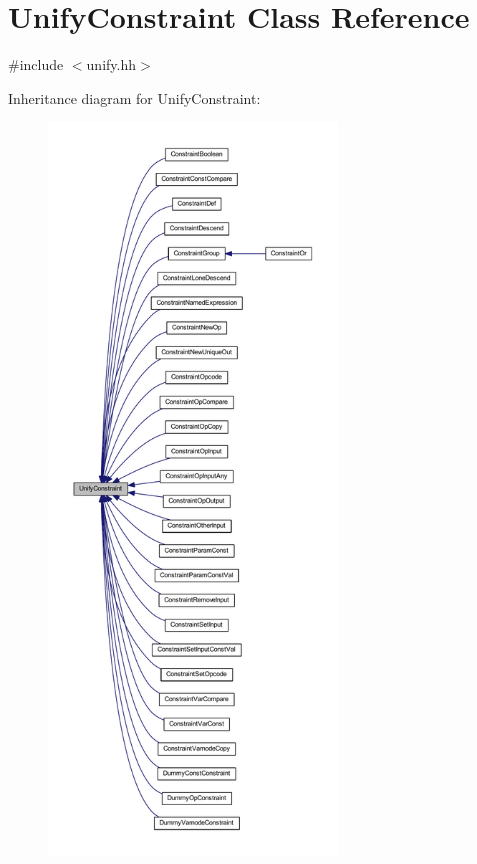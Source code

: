 \hypertarget{class_unify_constraint}{}\section{Unify\+Constraint Class Reference}
\label{class_unify_constraint}


{\ttfamily \#include $<$unify.\+hh$>$}



Inheritance diagram for Unify\+Constraint\+:
\nopagebreak
\begin{figure}[H]
\begin{center}
\leavevmode
\includegraphics[height=550pt]{class_unify_constraint__inherit__graph}
\end{center}
\end{figure}
